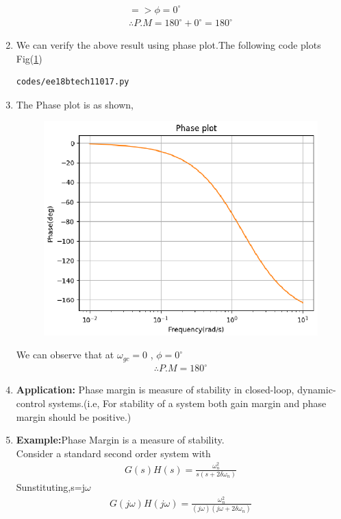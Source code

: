 \begin{enumerate}[label=\thesection.\arabic*.,ref=\thesection.\theenumi]
\begin{align}
=> \phi=0^{\circ}
\\
\therefore P.M=180^{\circ}+0^{\circ}=180^{\circ}
\end{align}

\item
We can verify the above result using phase plot.The following code plots Fig(\ref{fig:ee18btech11017})
\begin{lstlisting}
codes/ee18btech11017.py
\end{lstlisting}
\item
The Phase plot is as shown,
\begin{figure}[!h]
  \includegraphics[width=\columnwidth]{./figures/ee18btech11017.eps}
  \caption{}
  \label{fig:ee18btech11017}
\end{figure}
We can observe that at $\omega_{gc}=0$ , $\phi=0^{\circ}$
\\
\begin{align}
\therefore P.M=180^{\circ}
\end{align}
\item
\textbf{Application:} 
Phase margin is measure of stability in closed-loop, dynamic-control systems.(i.e, For stability of a system both gain margin and phase margin should be positive.)
\item
\textbf{Example:}Phase Margin is a measure of stability. \\
Consider a standard second order system with 
\\
\begin{align}
G(s)H(s)=\frac{\omega_{n}^{2}}{s(s+2 \delta \omega_{n})}
\label{eq:3} 
\end{align}
Sunstituting,s=j$\omega$
\begin{align}
G(j\omega)H(j\omega)=\frac{\omega_{n}^{2}}{(j\omega)(j\omega+2\delta\omega_{n})}
\\
\end{align}


\end{enumerate}
